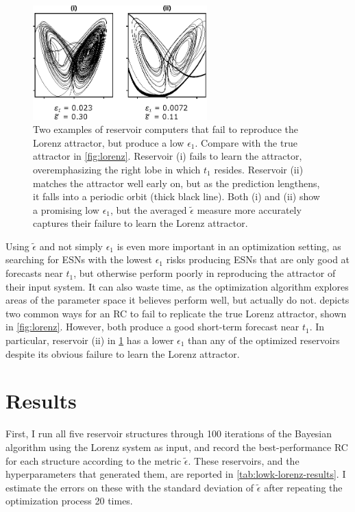 \begin{figure}
  \includegraphics[width=0.6\textwidth]{figures/epsilon-failure}
  \caption{Two examples of reservoir computers that fail to reproduce
    the Lorenz attractor, but produce a low $\epsilon_1$. Compare with
    the true attractor in \cref{fig:lorenz}. Reservoir (i) fails to
    learn the attractor, overemphasizing the right lobe in which $t_1$
    resides. Reservoir (ii) matches the attractor well early on, but
    as the prediction lengthens, it falls into a periodic orbit (thick
    black line). Both (i) and (ii) show a promising low $\epsilon_1$,
    but the averaged $\tilde{\epsilon}$ measure more accurately
    captures their failure to learn the Lorenz attractor.}%
  \label{fig:epsilon-failure}
\end{figure}

Using $\tilde{\epsilon}$ and not simply $\epsilon_1$ is even more
important in an optimization setting, as searching for ESNs with the
lowest $\epsilon_1$ risks producing ESNs that are only good at
forecasts near $t_1$, but otherwise perform poorly in reproducing the
attractor of their input system. It can also waste time, as the
optimization algorithm explores areas of the parameter space it
believes perform well, but actually do not. 
depicts two common ways for an RC to fail to replicate the true Lorenz
attractor, shown in \cref{fig:lorenz}. However, both produce a good
short-term forecast near $t_1$. In particular, reservoir (ii) in
\cref{fig:epsilon-failure} has a lower $\epsilon_1$ than any of
the optimized reservoirs despite its obvious failure to learn the
Lorenz attractor.

\section{Results}

First, I run all five reservoir structures through 100 iterations of
the Bayesian algorithm using the Lorenz system as input, and record
the best-performance RC for each structure according to the metric
$\tilde{\epsilon}$. These reservoirs, and the hyperparameters that
generated them, are reported in \cref{tab:lowk-lorenz-results}. I
estimate the errors on these with the standard deviation of
$\tilde{\epsilon}$ after repeating the optimization process 20 times.

